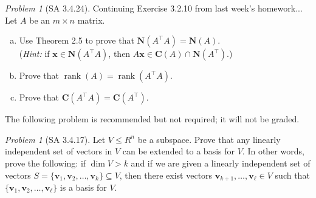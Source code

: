 \documentclass[fleqn,11pt]{paper}
\theoremstyle{remark}
\newtheorem{problem}{Problem}
\newtheorem*{prob}{Problem}
\newtheorem*{solution}{{\bf Solution}}
\renewcommand{\dim}{\ensuremath{\operatorname{dim}}}
\newcommand{\rank}{\ensuremath{\operatorname{rank}}}
\newcommand\bC{\ensuremath{\mathbf C}}
\newcommand\bN{\ensuremath{\mathbf N}}
\renewcommand{\vec}[1]{\mathbf{#1}}
\newcommand\vv{\vec{v}}
\newcommand\vx{\vec{x}}
\begin{document}
\newpage

\begin{problem}[SA 3.4.24]
  Continuing Exercise 3.2.10 from last week's homework... \\[4pt]
  Let $A$ be an $m\times n$ matrix.
\begin{enumerate}[a.]
\item  Use Theorem 2.5 to prove that $\bN(A^\top A) = \bN(A)$.\\[4pt]
  ({\it Hint:} if $\vx \in \bN(A^\top A)$, then $A\vx \in \bC(A) \cap \bN(A^\top)$.)
\item Prove that $\rank(A) = \rank(A^\top A)$.
\item Prove that $\bC(A^\top A) = \bC(A^\top)$.
\end{enumerate}
\end{problem}
\newpage

\noindent The following problem is recommended but not required; it will not be graded.
\begin{prob}[SA 3.4.17]
  Let $V \leq R^n$ be a subspace.
  Prove that any linearly independent set of vectors in $V$ can
  be extended to a basis for $V$. 
  In other words, prove the following: if $\dim V > k$ and if we are
  given a linearly independent set of vectors
  $S=\{\vv_1, \vv_2, \dots, \vv_k\} \subseteq V$, 
  then there exist vectors
  $\vv_{k+1}, \dots, \vv_\ell \in V$
  such that $\{\vv_1, \vv_2, \dots, \vv_\ell\}$ is a basis for $V$.
\end{prob}



\end{document}
